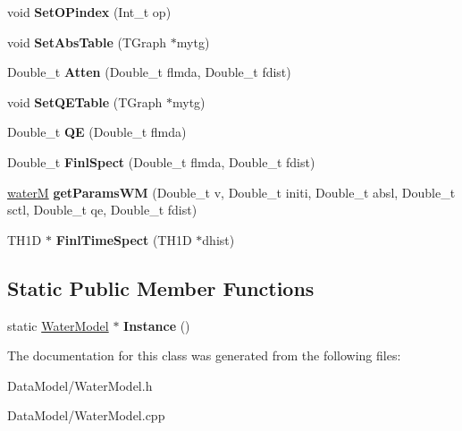 \begin{DoxyCompactItemize}
\item 
\hypertarget{classWaterModel_a8370e53fc75e530c5c5132073fe94c94}{void {\bfseries Set\-O\-Pindex} (Int\-\_\-t op)}\label{classWaterModel_a8370e53fc75e530c5c5132073fe94c94}

\item 
\hypertarget{classWaterModel_a027b9c8a50d0ee07e710f6c5330878f0}{void {\bfseries Set\-Abs\-Table} (T\-Graph $\ast$mytg)}\label{classWaterModel_a027b9c8a50d0ee07e710f6c5330878f0}

\item 
\hypertarget{classWaterModel_a75f300853d532a883fa1668707d6577b}{Double\-\_\-t {\bfseries Atten} (Double\-\_\-t flmda, Double\-\_\-t fdist)}\label{classWaterModel_a75f300853d532a883fa1668707d6577b}

\item 
\hypertarget{classWaterModel_a2b314a7cab6eafee7a490e604698a9a6}{void {\bfseries Set\-Q\-E\-Table} (T\-Graph $\ast$mytg)}\label{classWaterModel_a2b314a7cab6eafee7a490e604698a9a6}

\item 
\hypertarget{classWaterModel_a5db1a42335d54bef878e7152b7330b3f}{Double\-\_\-t {\bfseries Q\-E} (Double\-\_\-t flmda)}\label{classWaterModel_a5db1a42335d54bef878e7152b7330b3f}

\item 
\hypertarget{classWaterModel_a3bf124d715b5003c35e06e763f3bac97}{Double\-\_\-t {\bfseries Finl\-Spect} (Double\-\_\-t flmda, Double\-\_\-t fdist)}\label{classWaterModel_a3bf124d715b5003c35e06e763f3bac97}

\item 
\hypertarget{classWaterModel_afe6ee803b9a5974340282b75e2b4ff27}{\hyperlink{structWaterModel_1_1waterM}{water\-M} {\bfseries get\-Params\-W\-M} (Double\-\_\-t v, Double\-\_\-t initi, Double\-\_\-t absl, Double\-\_\-t sctl, Double\-\_\-t qe, Double\-\_\-t fdist)}\label{classWaterModel_afe6ee803b9a5974340282b75e2b4ff27}

\item 
\hypertarget{classWaterModel_a88e50d6c1c114d5e0bda0a4f8864d0ca}{T\-H1\-D $\ast$ {\bfseries Finl\-Time\-Spect} (T\-H1\-D $\ast$dhist)}\label{classWaterModel_a88e50d6c1c114d5e0bda0a4f8864d0ca}

\end{DoxyCompactItemize}
\subsection*{Static Public Member Functions}
\begin{DoxyCompactItemize}
\item 
\hypertarget{classWaterModel_ad75cfcce98d57ef4e84aa120e447f37a}{static \hyperlink{classWaterModel}{Water\-Model} $\ast$ {\bfseries Instance} ()}\label{classWaterModel_ad75cfcce98d57ef4e84aa120e447f37a}

\end{DoxyCompactItemize}


The documentation for this class was generated from the following files\-:\begin{DoxyCompactItemize}
\item 
Data\-Model/Water\-Model.\-h\item 
Data\-Model/Water\-Model.\-cpp\end{DoxyCompactItemize}
